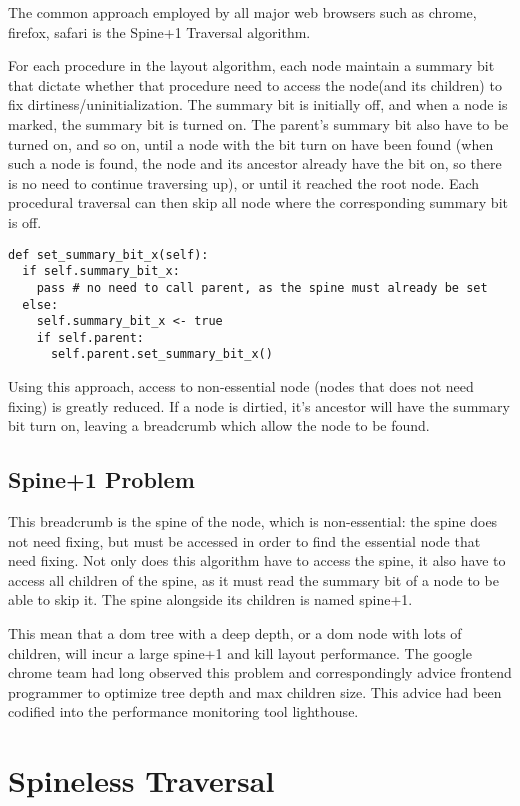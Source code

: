 \documentclass[format=acmsmall, review=false, screen=true]{acmart}
\begin{document}
The common approach employed by all major web browsers such as chrome, firefox, safari is the Spine+1 Traversal algorithm.

For each procedure in the layout algorithm, each node maintain a summary bit that dictate whether that procedure need to access the node(and its children) to fix dirtiness/uninitialization. The summary bit is initially off, and when a node is marked, the summary bit is turned on. The parent's summary bit also have to be turned on, and so on, until a node with the bit turn on have been found (when such a node is found, the node and its ancestor already have the bit on, so there is no need to continue traversing up), or until it reached the root node.  Each procedural traversal can then skip all node where the corresponding summary bit is off.

\begin{verbatim}
def set_summary_bit_x(self):
  if self.summary_bit_x:
    pass # no need to call parent, as the spine must already be set
  else:
    self.summary_bit_x <- true
    if self.parent:
      self.parent.set_summary_bit_x()
\end{verbatim}

Using this approach, access to non-essential node (nodes that does not need fixing) is greatly reduced. If a node is dirtied, it's ancestor will have the summary bit turn on, leaving a breadcrumb which allow the node to be found.

\subsection{Spine+1 Problem}
This breadcrumb is the spine of the node, which is non-essential: the spine does not need fixing, but must be accessed in order to find the essential node that need fixing. Not only does this algorithm have to access the spine, it also have to access all children of the spine, as it must read the summary bit of a node to be able to skip it. The spine alongside its children is named spine+1.

This mean that a dom tree with a deep depth, or a dom node with lots of children, will incur a large spine+1 and kill layout performance. The google chrome team had long observed this problem and correspondingly advice frontend programmer to optimize tree depth and max children size. This advice had been codified into the performance monitoring tool lighthouse.

\section{Spineless Traversal}
\end{document}
